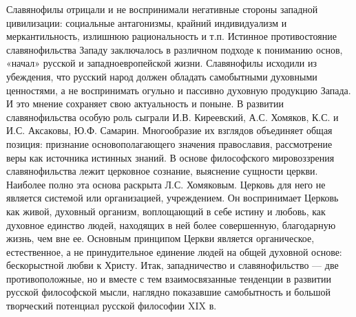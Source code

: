 \documentclass[12pt]{article}
\begin{document}
Славянофилы  отрицали  и  не  воспринимали  негативные  стороны  западной  цивилизации:  социальные
антагонизмы,  крайний  индивидуализм  и  меркантильность,  излишнюю  рациональность  и  т.п.  Истинное
противостояние  славянофильства  Западу  заключалось  в  различном  подходе  к  пониманию  основ,  «начал»
русской  и  западноевропейской  жизни.  Славянофилы  исходили  из  убеждения,  что  русский  народ  должен
обладать самобытными духовными ценностями, а не воспринимать огульно и пассивно духовную продукцию
Запада. И это мнение сохраняет свою актуальность и поныне.
В развитии славянофильства особую роль сыграли И.В. Киреевский, А.С. Хомяков, К.С. и И.С. Аксаковы, Ю.Ф.
Самарин.  Многообразие  их  взглядов  объединяет  общая  позиция:  признание  основополагающего  значения
православия,  рассмотрение  веры  как  источника  истинных  знаний.  В  основе  философского  мировоззрения
славянофильства лежит церковное сознание, выяснение сущности церкви. Наиболее полно эта основа раскрыта
Л.С. Хомяковым. Церковь для него не является системой или организацией, учреждением. Он воспринимает
Церковь как живой, духовный организм, воплощающий в себе истину и любовь, как духовное единство людей,
находящих в ней более совершенную, благодарную жизнь, чем вне ее. Основным принципом Церкви является
органическое, естественное, а не принудительное единение людей на общей духовной основе: бескорыстной
любви к Христу.
Итак,  западничество  и  славянофильство  —  две  противоположные,  но  и  вместе  с  тем  взаимосвязанные
тенденции в развитии русской философской мысли, наглядно показавшие самобытность и большой творческий
потенциал русской философии XIX в. 

\newpage
\end{document}
